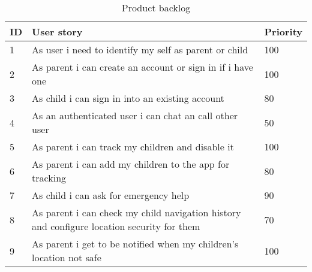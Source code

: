 \documentclass{article}
\begin{document}
	\begin{table}
		\centering
		\begin{tabular}{|p{}|p{}|p{}|}
			\hline
			ID & User story & Priority \\
			\hline
			1 & As user i need to identify my self as parent or child & 100 \\
			\hline
			2 & As parent i can create an account or sign in if i have one & 100 \\
			\hline
			3 & As child i can sign in into an existing account & 80 \\
			\hline
			4 & As an authenticated user i can chat an call other user & 50 \\
			\hline
			5 & As parent i can track my children and disable it & 100 \\
			\hline
			6 & As parent i can add my children to the app for tracking & 80 \\
			\hline
			7 & As child i can ask for emergency help & 90 \\
			\hline
			8 & As parent i can check my child navigation history and configure location security for them & 70 \\ 
			\hline
			9 & As parent i get to be notified when my children's location
			not safe & 100 \\
			\hline
		\end{tabular}
	\caption{Product backlog}
	\end{table}
\end{document}
